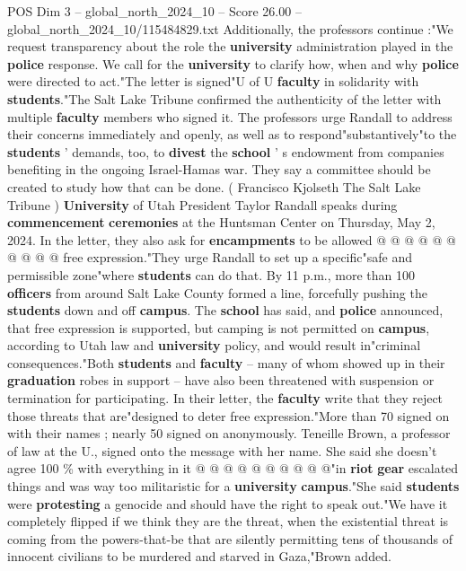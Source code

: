 \begin{textsample}{POS Dim 3 – global\_north\_2024\_10 – Score 26.00 – global\_north\_2024\_10/115484829.txt}
Additionally, the professors continue :"We request transparency about the role the \textbf{university} administration played in the \textbf{police} response.
We call for the \textbf{university} to clarify how, when and why \textbf{police} were directed to act."The letter is signed"U of U \textbf{faculty} in solidarity with \textbf{students}."The Salt Lake Tribune confirmed the authenticity of the letter with multiple \textbf{faculty} members who signed it.
The professors urge Randall to address their concerns immediately and openly, as well as to respond"substantively"to the \textbf{students} ' demands, too, to \textbf{divest} the \textbf{school} ' s endowment from companies benefiting in the ongoing Israel-Hamas war.
They say a committee should be created to study how that can be done. ( Francisco Kjolseth The Salt Lake Tribune ) \textbf{University} of Utah President Taylor Randall speaks during \textbf{commencement} \textbf{ceremonies} at the Huntsman Center on Thursday, May 2, 2024.
In the letter, they also ask for \textbf{encampments} to be allowed @ @ @ @ @ @ @ @ @ @ free expression."They urge Randall to set up a specific"safe and permissible zone"where \textbf{students} can do that.
By 11 p.m., more than 100 \textbf{officers} from around Salt Lake County formed a line, forcefully pushing the \textbf{students} down and off \textbf{campus}.
The \textbf{school} has said, and \textbf{police} announced, that free expression is supported, but camping is not permitted on \textbf{campus}, according to Utah law and \textbf{university} policy, and would result in"criminal consequences."Both \textbf{students} and \textbf{faculty} -- many of whom showed up in their \textbf{graduation} robes in support -- have also been threatened with suspension or termination for participating.
In their letter, the \textbf{faculty} write that they reject those threats that are"designed to deter free expression."More than 70 signed on with their names ; nearly 50 signed on anonymously.
Teneille Brown, a professor of law at the U., signed onto the message with her name.
She said she doesn't agree 100 \% with everything in it @ @ @ @ @ @ @ @ @ @"in \textbf{riot} \textbf{gear} escalated things and was way too militaristic for a \textbf{university} \textbf{campus}."She said \textbf{students} were \textbf{protesting} a genocide and should have the right to speak out."We have it completely flipped if we think they are the threat, when the existential threat is coming from the powers-that-be that are silently permitting tens of thousands of innocent civilians to be murdered and starved in Gaza,"Brown added.

\end{textsample}
